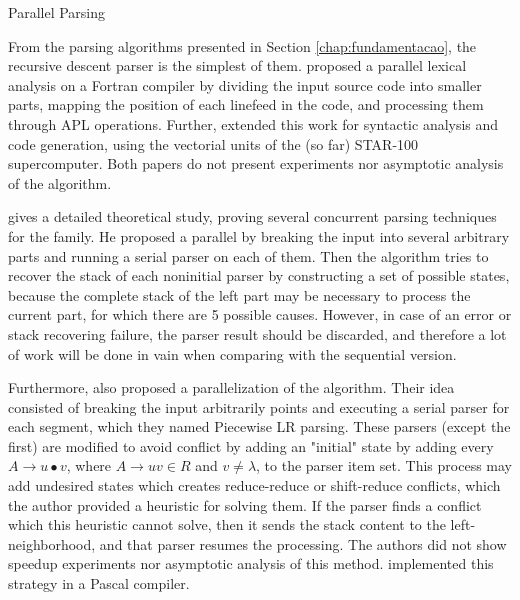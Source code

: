 \begin{section}{Parallel Parsing}

From the parsing algorithms presented in Section \ref{chap:fundamentacao}, the
recursive descent parser is the simplest of them.
\cite{Lincoln:1970:PPT:987475.987478} proposed a parallel lexical analysis on a
Fortran compiler by dividing the input source code into smaller parts, mapping
the position of each linefeed in the code, and processing them through APL
operations. Further, \cite{Krohn:1975:PAC:390015.808414} extended this work for
syntactic analysis and code generation, using the vectorial units of the (so
far) STAR-100 supercomputer. Both papers do not present experiments nor
asymptotic analysis of the algorithm.

\cite{fischer1975parsing} gives a detailed theoretical study, proving several
concurrent parsing techniques for the  family. He proposed a parallel
 by breaking the input into several arbitrary parts and running a serial
parser on each of them. Then the algorithm tries to recover the stack of each
noninitial parser by constructing a set of possible states, because the
complete stack of the left part may be necessary to process the current part,
for which there are 5 possible causes. However, in case of an error or stack
recovering failure, the parser result should be discarded, and therefore a lot
of work will be done in vain when comparing with the sequential version.

Furthermore, \cite{Mickunas:1978:PCM:800127.804105} also proposed a parallelization
of the  algorithm. Their idea consisted of breaking the input arbitrarily
points and executing a serial parser for each segment, which they named Piecewise
LR parsing. These parsers (except the first) are modified to avoid conflict by
adding an "initial" state by adding every $A \rightarrow u \bullet v$, where $A \rightarrow uv \in
R$ and $v \neq \lambda$, to the parser item set. This process may add undesired
states which creates reduce-reduce or shift-reduce conflicts, which the author
provided a heuristic for solving them.  If the parser finds a conflict which
this heuristic cannot solve, then it sends the stack content to the
left-neighborhood, and that parser resumes the processing. The authors
did not show speedup experiments nor asymptotic analysis of this method.
\cite{Pennello:1978:FMA:512760.512786} implemented this strategy in a Pascal
compiler.


\end{section}
